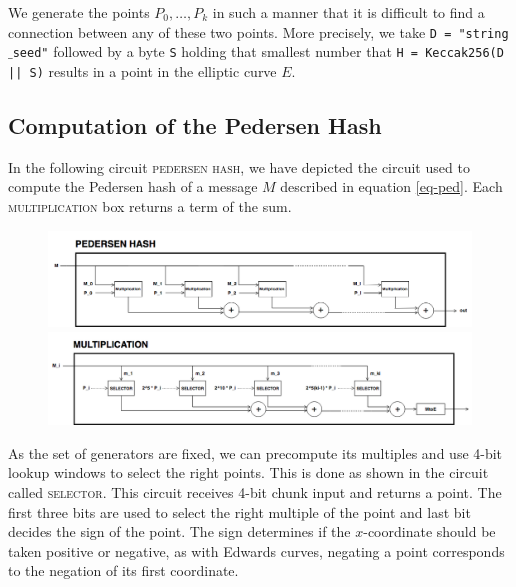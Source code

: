 \documentclass{article}
\begin{document}
\begin{spacing}{1.2}
	We generate the points $P_0,\dots,P_{{k}}$ in such a manner that it is difficult to find a connection between any of these two points. More precisely, we take \texttt{D =  "string$\_$seed"} followed by a byte \texttt{S} holding that smallest number that \texttt{H = Keccak256(D || S)} results in a point in the elliptic curve $E$.

	\subsection{Computation of the Pedersen Hash} \label{sec-computation}

	In the following circuit \textsc{pedersen hash}, we have depicted the circuit used to compute the Pedersen hash of a message $M$ described in equation \ref{eq-ped}. Each \textsc{multiplication} box returns a term of the sum. 
	
		\begin{figure}[h]
			\centering
			\includegraphics[scale=0.4]{../../figures/pedersen-hash.png}
			\includegraphics[scale=0.4]{../../figures/pedersen-multiplication.png}
		\end{figure}
	
	As the set of generators are fixed, we can precompute its multiples and use 4-bit lookup windows to select the right points. This is done as shown in the circuit called \textsc{selector}. This circuit receives 4-bit chunk input and returns a point. The first three bits are used to select the right multiple of the point and last bit decides the sign of the point. The sign determines if the $x$-coordinate should be taken positive or negative, as with Edwards curves, negating a point corresponds to the negation of its first coordinate.
		

\end{spacing}
\end{document}
